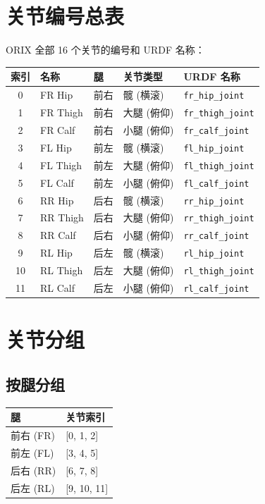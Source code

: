 \documentclass[a4paper,11pt,openany]{book}
\begin{document}
\section{关节编号总表}

ORIX 全部 16 个关节的编号和 URDF 名称：

\begin{longtable}{cllll}
\toprule
索引 & 名称 & 腿 & 关节类型 & URDF 名称 \\
\midrule
\endhead
0  & FR Hip   & 前右 & 髋 (横滚) & \texttt{fr\_hip\_joint} \\
1  & FR Thigh & 前右 & 大腿 (俯仰) & \texttt{fr\_thigh\_joint} \\
2  & FR Calf  & 前右 & 小腿 (俯仰) & \texttt{fr\_calf\_joint} \\
3  & FL Hip   & 前左 & 髋 (横滚) & \texttt{fl\_hip\_joint} \\
4  & FL Thigh & 前左 & 大腿 (俯仰) & \texttt{fl\_thigh\_joint} \\
5  & FL Calf  & 前左 & 小腿 (俯仰) & \texttt{fl\_calf\_joint} \\
6  & RR Hip   & 后右 & 髋 (横滚) & \texttt{rr\_hip\_joint} \\
7  & RR Thigh & 后右 & 大腿 (俯仰) & \texttt{rr\_thigh\_joint} \\
8  & RR Calf  & 后右 & 小腿 (俯仰) & \texttt{rr\_calf\_joint} \\
9  & RL Hip   & 后左 & 髋 (横滚) & \texttt{rl\_hip\_joint} \\
10 & RL Thigh & 后左 & 大腿 (俯仰) & \texttt{rl\_thigh\_joint} \\
11 & RL Calf  & 后左 & 小腿 (俯仰) & \texttt{rl\_calf\_joint} \\
\bottomrule
\end{longtable}

\section{关节分组}

\subsection{按腿分组}

\begin{longtable}{ll}
\toprule
腿 & 关节索引 \\
\midrule
前右 (FR) & {[}0, 1, 2{]} \\
前左 (FL) & {[}3, 4, 5{]} \\
后右 (RR) & {[}6, 7, 8{]} \\
后左 (RL) & {[}9, 10, 11{]} \\
\bottomrule
\end{longtable}
\end{document}
